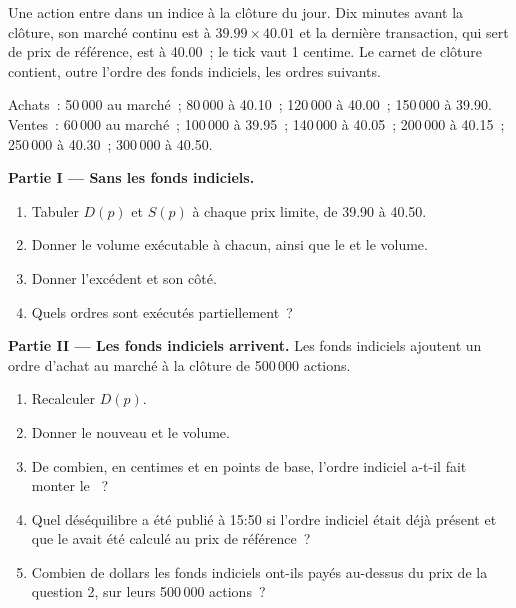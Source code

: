 \begin{problem}\label{pb:m1:auctions:1}
Une action entre dans un indice à la clôture du jour. Dix minutes avant la clôture, son
marché continu est à $39.99 \times 40.01$ et la dernière transaction, qui sert de prix de référence,
est à 40.00~; le tick vaut 1 centime. Le carnet de clôture contient, outre
l'ordre des fonds indiciels, les ordres suivants.

Achats~: 50\,000 au marché~; 80\,000 à 40.10~; 120\,000 à 40.00~; 150\,000 à 39.90.
Ventes~: 60\,000 au marché~; 100\,000 à 39.95~; 140\,000 à 40.05~; 200\,000 à
40.15~; 250\,000 à 40.30~; 300\,000 à 40.50.

\medskip\noindent\textbf{Partie I --- Sans les fonds indiciels.}
\begin{enumerate}
\item Tabuler $D(p)$ et $S(p)$ à chaque prix limite, de 39.90 à 40.50.
\item Donner le volume exécutable à chacun, ainsi que le  et le volume.
\item Donner l'excédent et son côté.
\item Quels ordres sont exécutés partiellement~?
\end{enumerate}

\medskip\noindent\textbf{Partie II --- Les fonds indiciels arrivent.}
Les fonds indiciels ajoutent un ordre d'achat au marché à la clôture de 500\,000 actions.
\begin{enumerate}[resume]
\item Recalculer $D(p)$.
\item Donner le nouveau  et le volume.
\item De combien, en centimes et en points de base, l'ordre indiciel a-t-il fait monter
le ~?
\item Quel déséquilibre a été publié à 15:50 si l'ordre indiciel était déjà
présent et que le  avait été calculé au prix de référence~?
\item Combien de dollars les fonds indiciels ont-ils payés au-dessus du prix de la question
2, sur leurs 500\,000 actions~?
\end{enumerate}


\end{problem}
